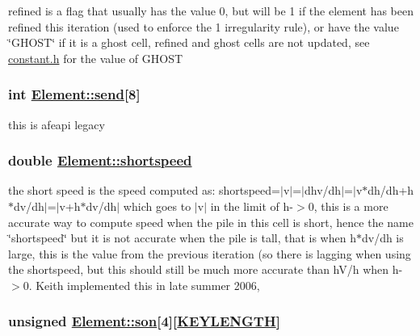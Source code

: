 refined is a flag that usually has the value 0, but will be 1 if the element has been refined this iteration (used to enforce the 1 irregularity rule), or have the value \char`\"{}GHOST\char`\"{} if it is a ghost cell, refined and ghost cells are not updated, see \hyperlink{constant_8h}{constant.h} for the value of GHOST 

\hypertarget{classElement_r26}{
\subsubsection[send]{\setlength{\rightskip}{0pt plus 5cm}int \hyperlink{classElement_r26}{Element::send}\mbox{[}8\mbox{]}}}
\label{classElement_r26}


this is afeapi legacy 

\hypertarget{classElement_r31}{
\subsubsection[shortspeed]{\setlength{\rightskip}{0pt plus 5cm}double \hyperlink{classElement_r31}{Element::shortspeed}}}
\label{classElement_r31}


the short speed is the speed computed as: shortspeed=$|$v$|$=$|$dhv/dh$|$=$|$v$\ast$dh/dh+h$\ast$dv/dh$|$=$|$v+h$\ast$dv/dh$|$ which goes to $|$v$|$ in the limit of h-$>$0, this is a more accurate way to compute speed when the pile in this cell is short, hence the name \char`\"{}shortspeed\char`\"{} but it is not accurate when the pile is tall, that is when h$\ast$dv/dh is large, this is the value from the previous iteration (so there is lagging when using the shortspeed, but this should still be much more accurate than h\-V/h when h-$>$0. Keith implemented this in late summer 2006, 

\hypertarget{classElement_r10}{
\subsubsection[son]{\setlength{\rightskip}{0pt plus 5cm}unsigned \hyperlink{classElement_r10}{Element::son}\mbox{[}4\mbox{]}\mbox{[}\hyperlink{constant_8h_a10}{KEYLENGTH}\mbox{]}}}
\label{classElement_r10}


